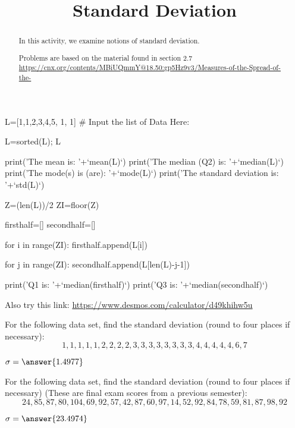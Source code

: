 \documentclass{ximera}
\title{Standard Deviation}
\begin{document}
      
\begin{abstract}
      
In this activity, we examine notions of standard deviation.

Problems are based on the material found in section 2.7 \url{https://cnx.org/contents/MBiUQmmY@18.50:gp5Hz9v3/Measures-of-the-Spread-of-the-}
      
\end{abstract}
      
\maketitle
 
 \begin{sageCell}
L=[1,1,2,3,4,5, 1, 1] # Input the list of Data Here:

L=sorted(L); L


print('The mean is: '+`mean(L)`)
print('The median (Q2) is: '+`median(L)`)
print('The mode(s) is (are): '+`mode(L)`)
print('The standard deviation is: '+`std(L)`)

Z=(len(L))/2
ZI=floor(Z)

firsthalf=[]
secondhalf=[]

for i in range(ZI):
    firsthalf.append(L[i])

    
for j in range(ZI):
    secondhalf.append(L[len(L)-j-1])


print('Q1 is: '+`median(firsthalf)`)
print('Q3 is: '+`median(secondhalf)`)
\end{sageCell} 
     
Also try this link: \url{https://www.desmos.com/calculator/d49khihw5u}   
     
 
\begin{problem}
For the following data set, find the standard deviation (round to four places if necessary):
$$1,1,1,1,1,2,2,2,2,3,3,3,3,3,3,3,3,4,4,4,4,4,6,7$$

$\sigma=\answer{1.4977}$

\end{problem}


\begin{problem}
For the following data set, find the standard deviation (round to four places if necessary) (These are final exam scores from a previous semester):
$$24, 85, 87,80, 104, 69, 92, 57, 42, 87, 60, 97, 14, 52, 92, 84, 78, 59, 81, 87, 98, 92$$

$\sigma=\answer{23.4974}$


\end{problem}
\end{document}
